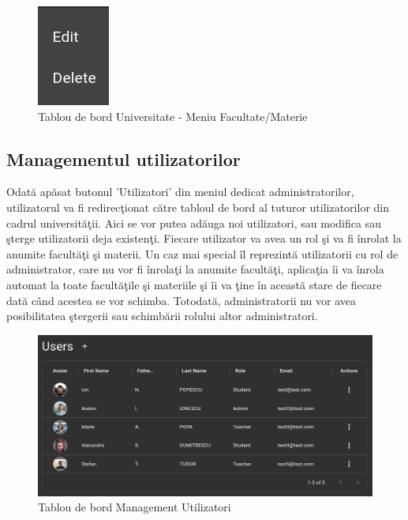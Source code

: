 \documentclass[12pt, a4paper, oneside, romanian]{teza-upb}
\begin{document}
\begin{figure}[H]
\centering
\includegraphics*[width=0.15\columnwidth]{tablou-de-bord-universitate-meniu-facultate}
\caption{Tablou de bord Universitate - Meniu Facultate/Materie}
\label{tablou-de-bord-universitate-meniu-facultate}
\end{figure}

\subsection{Managementul utilizatorilor}

Odată apăsat butonul 'Utilizatori' din meniul dedicat administratorilor, utilizatorul va fi redirecţionat către tabloul de bord al tuturor utilizatorilor din cadrul universităţii. Aici se vor putea adăuga noi utilizatori, sau modifica sau şterge utilizatorii deja existenţi. Fiecare utilizator va avea un rol şi va fi înrolat la anumite facultăţi şi materii. Un caz mai special îl reprezintă utilizatorii cu rol de administrator, care nu vor fi înrolaţi la anumite facultăţi, aplicaţia îi va înrola automat la toate facultăţile şi materiile şi îi va ţine în această stare de fiecare dată când acestea se vor schimba. Totodată, administratorii nu vor avea posibilitatea ştergerii sau schimbării rolului altor administratori.

\begin{figure}[H]
\centering
\includegraphics*[width=\columnwidth]{tablou-de-bord-management-utilizatori}
\caption{Tablou de bord Management Utilizatori}
\label{tablou-de-bord-management-utilizatori}
\end{figure}
\end{document}
